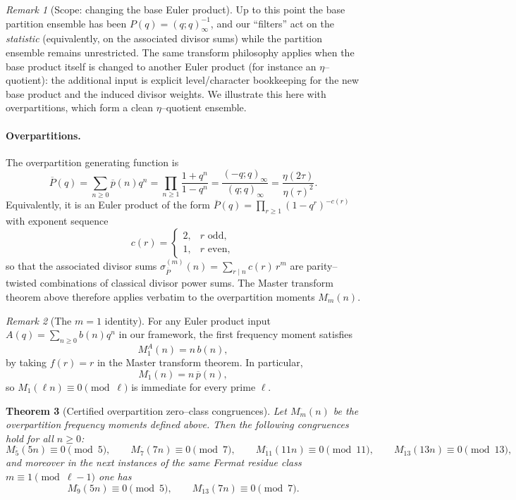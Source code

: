 \documentclass[11pt]{article}
\newtheorem{theorem}{Theorem}[section]
\theoremstyle{definition}
\theoremstyle{remark}
\newtheorem{remark}[theorem]{Remark}
\begin{document}
\begin{remark}[Scope: changing the base Euler product]\label{rem:scope-ensemble}
Up to this point the base partition ensemble has been
$P(q)=(q;q)_\infty^{-1}$, and our ``filters'' act on the \emph{statistic}
(equivalently, on the associated divisor sums) while the partition ensemble
remains unrestricted.  The same transform philosophy applies when the base
product itself is changed to another Euler product (for instance an
$\eta$--quotient): the additional input is explicit level/character bookkeeping
for the new base product and the induced divisor weights.  We illustrate this
here with overpartitions, which form a clean $\eta$--quotient ensemble.
\end{remark}

\paragraph{Overpartitions.}
The overpartition generating function is
\[
\overline{P}(q)
=\sum_{n\ge0}\overline{p}(n)q^n
=\prod_{n\ge1}\frac{1+q^n}{1-q^n}
=\frac{(-q;q)_\infty}{(q;q)_\infty}
=\frac{\eta(2\tau)}{\eta(\tau)^2}.
\]
Equivalently, it is an Euler product of the form
$\overline{P}(q)=\prod_{r\ge1}(1-q^r)^{-c(r)}$ with exponent sequence
\[
c(r)=
\begin{cases}
2, & r \text{ odd},\\
1, & r \text{ even},
\end{cases}
\]
so that the associated divisor sums
$\sigma^{(m)}_{\overline{P}}(n)=\sum_{r\mid n} c(r)\,r^m$
are parity--twisted combinations of classical divisor power sums.  The
Master transform theorem above therefore applies verbatim to the overpartition
moments $M^{\overline{\ }}_m(n)$.

\begin{remark}[The $m=1$ identity]\label{rem:overpart-m1}
For any Euler product input $A(q)=\sum_{n\ge0}b(n)q^n$ in our framework, the
first frequency moment satisfies
\[
M^A_1(n)=n\,b(n),
\]
by taking $f(r)=r$ in the Master transform theorem.  In particular,
\[
M^{\overline{\ }}_1(n)=n\,\overline{p}(n),
\]
so $M^{\overline{\ }}_1(\ell n)\equiv0\pmod{\ell}$ is immediate for every prime
$\ell$.
\end{remark}

\begin{theorem}[Certified overpartition zero--class congruences]\label{thm:overpart-zero}
Let $M^{\overline{\ }}_m(n)$ be the overpartition frequency moments defined
above.  Then the following congruences hold for all $n\ge0$:
\[
M^{\overline{\ }}_{5}(5n)\equiv 0 \pmod{5},\qquad
M^{\overline{\ }}_{7}(7n)\equiv 0 \pmod{7},\qquad
M^{\overline{\ }}_{11}(11n)\equiv 0 \pmod{11},\qquad
M^{\overline{\ }}_{13}(13n)\equiv 0 \pmod{13},
\]
and moreover in the next instances of the same Fermat residue class
$m\equiv 1\pmod{\ell-1}$ one has
\[
M^{\overline{\ }}_{9}(5n)\equiv 0 \pmod{5},\qquad
M^{\overline{\ }}_{13}(7n)\equiv 0 \pmod{7}.
\]
\end{theorem}
\end{document}
